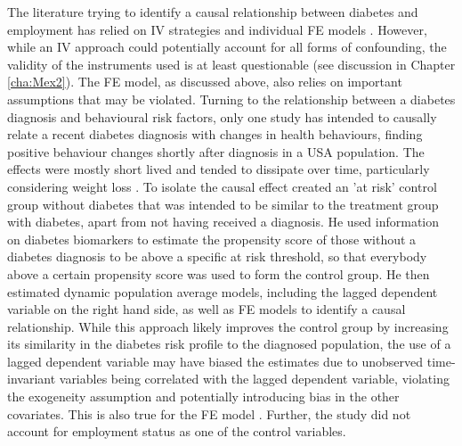 

The literature trying to identify a causal relationship between diabetes and employment has relied on \ac{IV} strategies \parencite{Brown2005,Latif2009,Seuring2015} and individual \ac{FE} models \parencite{Seuring2016}. However, while an \ac{IV} approach could potentially account for all forms of confounding, the validity of the instruments used is at least questionable (see discussion in Chapter \ref{cha:Mex2}). The \ac{FE} model, as discussed above, also relies on important assumptions that may be violated. Turning to the relationship between a diabetes diagnosis and behavioural risk factors, only one study has intended to causally relate a recent diabetes diagnosis with changes in health behaviours, finding positive behaviour changes shortly after diagnosis in a USA population. The \DIFdelbegin {}\DIFdelend effects were mostly short lived and tended to dissipate over time, particularly considering weight loss \parencite{Slade2012}. To isolate the causal effect \textcite{Slade2012} created an 'at risk' control group without diabetes that was intended to be similar to the treatment group with diabetes, apart from not having received a diagnosis. He used information on diabetes biomarkers to estimate the propensity score of those without a diabetes diagnosis to be above a specific at risk threshold, so that everybody above a certain propensity score was used to form the control group. He then estimated dynamic population average models, including the lagged dependent variable on the right hand side, as well as \ac{FE} models to identify a causal relationship. While this approach likely improves the control group by increasing its similarity in the diabetes risk profile to the diagnosed population, the use of a lagged dependent variable may have biased the estimates due to unobserved time-invariant variables being correlated with the lagged dependent variable, violating the exogeneity assumption and potentially introducing bias in the other covariates. This is also true for the \ac{FE} model \parencite{Nickell1981,Anderson1982}. Further, the study did not account for employment status as one of the control variables. 

